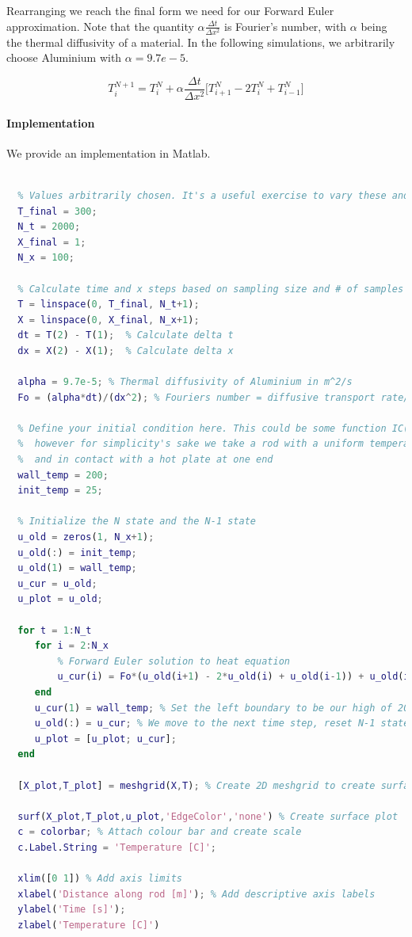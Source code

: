 \noindent Rearranging we reach the final form we need for our Forward Euler approximation. Note that the quantity $\alpha\frac{\Delta t}{\Delta x^2}$ is Fourier's number, with $\alpha$ being the thermal diffusivity of a material. In the following simulations, we arbitrarily choose Aluminium with $\alpha = 9.7e-5$.

\begin{equation}
T_{i}^{N+1}=T_{i}^{N}+\alpha\frac{\Delta t}{\Delta x^2}\big[ {T_{i+1}^{N}-2T_{i}^{N}+T_{i-1}^{N}}\big]
\end{equation}

\paragraph{Implementation}
We provide an implementation in Matlab. 

\begin{lstlisting}[language=Matlab, caption=Forward Euler and Plotting in MATLAB]

  % Values arbitrarily chosen. It's a useful exercise to vary these and look at the results
  T_final = 300;
  N_t = 2000;
  X_final = 1;
  N_x = 100;
  
  % Calculate time and x steps based on sampling size and # of samples
  T = linspace(0, T_final, N_t+1);
  X = linspace(0, X_final, N_x+1);
  dt = T(2) - T(1);  % Calculate delta t
  dx = X(2) - X(1);  % Calculate delta x

  alpha = 9.7e-5; % Thermal diffusivity of Aluminium in m^2/s
  Fo = (alpha*dt)/(dx^2); % Fouriers number = diffusive transport rate/storage rate
 
  % Define your initial condition here. This could be some function IC(x),
  %  however for simplicity's sake we take a rod with a uniform temperature
  %  and in contact with a hot plate at one end
  wall_temp = 200;
  init_temp = 25;
  
  % Initialize the N state and the N-1 state
  u_old = zeros(1, N_x+1); 
  u_old(:) = init_temp;
  u_old(1) = wall_temp;
  u_cur = u_old;
  u_plot = u_old;

  for t = 1:N_t
     for i = 2:N_x
     	 % Forward Euler solution to heat equation
         u_cur(i) = Fo*(u_old(i+1) - 2*u_old(i) + u_old(i-1)) + u_old(i);
     end
     u_cur(1) = wall_temp; % Set the left boundary to be our high of 200 
     u_old(:) = u_cur; % We move to the next time step, reset N-1 state
     u_plot = [u_plot; u_cur];
  end

  [X_plot,T_plot] = meshgrid(X,T); % Create 2D meshgrid to create surface plot

  surf(X_plot,T_plot,u_plot,'EdgeColor','none') % Create surface plot
  c = colorbar; % Attach colour bar and create scale
  c.Label.String = 'Temperature [C]';

  xlim([0 1]) % Add axis limits
  xlabel('Distance along rod [m]'); % Add descriptive axis labels
  ylabel('Time [s]');
  zlabel('Temperature [C]')

\end{lstlisting}


